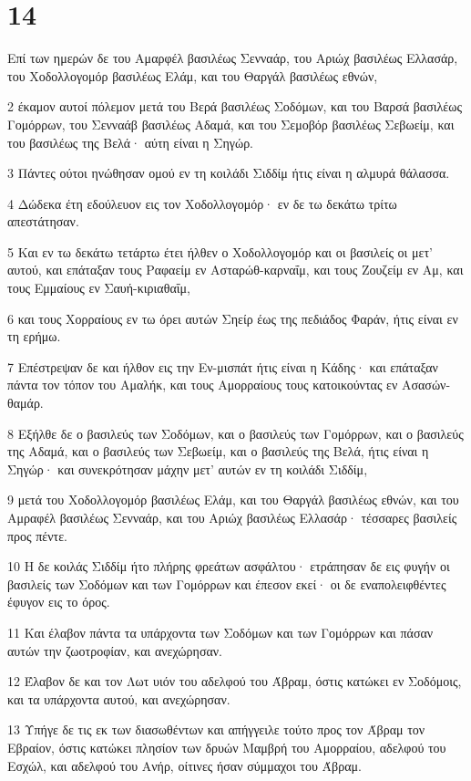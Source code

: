 \chapter{14}

\par Επί των ημερών δε του Αμαρφέλ βασιλέως Σενναάρ, του Αριώχ βασιλέως Ελλασάρ, του Χοδολλογομόρ βασιλέως Ελάμ, και του Θαργάλ βασιλέως εθνών,
\par 2 έκαμον αυτοί πόλεμον μετά του Βερά βασιλέως Σοδόμων, και του Βαρσά βασιλέως Γομόρρων, του Σενναάβ βασιλέως Αδαμά, και του Σεμοβόρ βασιλέως Σεβωείμ, και του βασιλέως της Βελά· αύτη είναι η Σηγώρ.
\par 3 Πάντες ούτοι ηνώθησαν ομού εν τη κοιλάδι Σιδδίμ ήτις είναι η αλμυρά θάλασσα.
\par 4 Δώδεκα έτη εδούλευον εις τον Χοδολλογομόρ· εν δε τω δεκάτω τρίτω απεστάτησαν.
\par 5 Και εν τω δεκάτω τετάρτω έτει ήλθεν ο Χοδολλογομόρ και οι βασιλείς οι μετ' αυτού, και επάταξαν τους Ραφαείμ εν Ασταρώθ-καρναΐμ, και τους Ζουζείμ εν Αμ, και τους Εμμαίους εν Σαυή-κιριαθαΐμ,
\par 6 και τους Χορραίους εν τω όρει αυτών Σηείρ έως της πεδιάδος Φαράν, ήτις είναι εν τη ερήμω.
\par 7 Επέστρεψαν δε και ήλθον εις την Εν-μισπάτ ήτις είναι η Κάδης· και επάταξαν πάντα τον τόπον του Αμαλήκ, και τους Αμορραίους τους κατοικούντας εν Ασασών-θαμάρ.
\par 8 Εξήλθε δε ο βασιλεύς των Σοδόμων, και ο βασιλεύς των Γομόρρων, και ο βασιλεύς της Αδαμά, και ο βασιλεύς των Σεβωείμ, και ο βασιλεύς της Βελά, ήτις είναι η Σηγώρ· και συνεκρότησαν μάχην μετ' αυτών εν τη κοιλάδι Σιδδίμ,
\par 9 μετά του Χοδολλογομόρ βασιλέως Ελάμ, και του Θαργάλ βασιλέως εθνών, και του Αμραφέλ βασιλέως Σενναάρ, και του Αριώχ βασιλέως Ελλασάρ· τέσσαρες βασιλείς προς πέντε.
\par 10 Η δε κοιλάς Σιδδίμ ήτο πλήρης φρεάτων ασφάλτου· ετράπησαν δε εις φυγήν οι βασιλείς των Σοδόμων και των Γομόρρων και έπεσον εκεί· οι δε εναπολειφθέντες έφυγον εις το όρος.
\par 11 Και έλαβον πάντα τα υπάρχοντα των Σοδόμων και των Γομόρρων και πάσαν αυτών την ζωοτροφίαν, και ανεχώρησαν.
\par 12 Έλαβον δε και τον Λωτ υιόν του αδελφού του Άβραμ, όστις κατώκει εν Σοδόμοις, και τα υπάρχοντα αυτού, και ανεχώρησαν.
\par 13 Υπήγε δε τις εκ των διασωθέντων και απήγγειλε τούτο προς τον Άβραμ τον Εβραίον, όστις κατώκει πλησίον των δρυών Μαμβρή του Αμορραίου, αδελφού του Εσχώλ, και αδελφού του Ανήρ, οίτινες ήσαν σύμμαχοι του Άβραμ.
